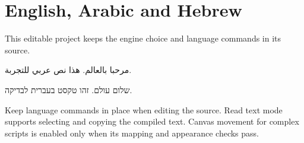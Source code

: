 \documentclass[11pt]{article}
\begin{document}
\section*{English, Arabic and Hebrew}
This editable project keeps the engine choice and language commands in its source.

\begin{Arabic}
مرحبا بالعالم. هذا نص عربي للتجربة.
\end{Arabic}

\begin{hebrew}
שלום עולם. זהו טקסט בעברית לבדיקה.
\end{hebrew}

Keep language commands in place when editing the source. Read text mode supports
selecting and copying the compiled text. Canvas movement for complex scripts is
enabled only when its mapping and appearance checks pass.
\end{document}
